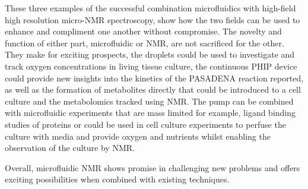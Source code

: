 These three examples of the successful combination microfluidics with high-field high resolution micro-NMR
spectroscopy, show how the two fields can be used to enhance and compliment one another without compromise. The
novelty and function of either part, microfluidic or NMR, are not sacrificed for the other. They make
for exciting prospects, the droplets could be used to investigate and track oxygen concentrations in living
tissue culture, the continuous PHIP device could provide new insights into the kinetics of the PASADENA
reaction reported, as well as the formation of metabolites directly that could be introduced to a cell culture and
the metabolomics tracked using NMR. The pump can be combined with microfluidic experiments that are mass limited
for example, ligand binding studies of proteins or could be used in cell culture experiments to perfuse the
culture with media and provide oxygen and nutrients whilst enabling the observation of the culture by NMR.

Overall, microfluidic NMR shows promise in challenging new problems and offers exciting possibilities
when combined with existing techniques.
